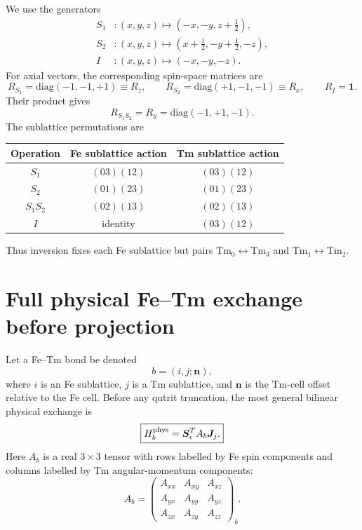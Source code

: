 \documentclass[11pt,a4paper]{article}
\newcommand{\diag}{\mathrm{diag}}
\newcommand{\ve}[1]{\boldsymbol{#1}}
\begin{document}
We use the generators
\begin{align}
  S_1 &: (x,y,z)\mapsto(-x,-y,z+\tfrac12),\\
  S_2 &: (x,y,z)\mapsto(x+\tfrac12,-y+\tfrac12,-z),\\
  I &: (x,y,z)\mapsto(-x,-y,-z).
\end{align}
For axial vectors, the corresponding spin-space matrices are
\begin{equation}
  R_{S_1}=\diag(-1,-1,+1)\equiv R_z,
  \qquad
  R_{S_2}=\diag(+1,-1,-1)\equiv R_x,
  \qquad
  R_I=\mathbf 1.
\end{equation}
Their product gives
\begin{equation}
  R_{S_1S_2}=R_y=\diag(-1,+1,-1).
\end{equation}
The sublattice permutations are
\begin{center}
\renewcommand{\arraystretch}{1.15}
\begin{tabular}{ccc}
\toprule
Operation & Fe sublattice action & Tm sublattice action\\
\midrule
$S_1$ & $(03)(12)$ & $(03)(12)$\\
$S_2$ & $(01)(23)$ & $(01)(23)$\\
$S_1S_2$ & $(02)(13)$ & $(02)(13)$\\
$I$ & identity & $(03)(12)$\\
\bottomrule
\end{tabular}
\end{center}
Thus inversion fixes each Fe sublattice but pairs Tm$_0\leftrightarrow$Tm$_3$ and Tm$_1\leftrightarrow$Tm$_2$.

\section{Full physical Fe--Tm exchange before projection}

Let a Fe--Tm bond be denoted
\begin{equation}
  b=(i,j;\ve n),
\end{equation}
where $i$ is an Fe sublattice, $j$ is a Tm sublattice, and $\ve n$ is the Tm-cell offset relative to the Fe cell.
Before any qutrit truncation, the most general bilinear physical exchange is
\begin{equation}
  \boxed{
  H_b^{\rm phys}=\ve S_i^T A_b\ve J_j .}
  \label{eq:phys-exchange}
\end{equation}
Here $A_b$ is a real $3\times3$ tensor with rows labelled by Fe spin components and columns labelled by Tm angular-momentum components:
\begin{equation}
  A_b=
  \begin{pmatrix}
    A_{xx}&A_{xy}&A_{xz}\\
    A_{yx}&A_{yy}&A_{yz}\\
    A_{zx}&A_{zy}&A_{zz}
  \end{pmatrix}_b.
\end{equation}
\end{document}
